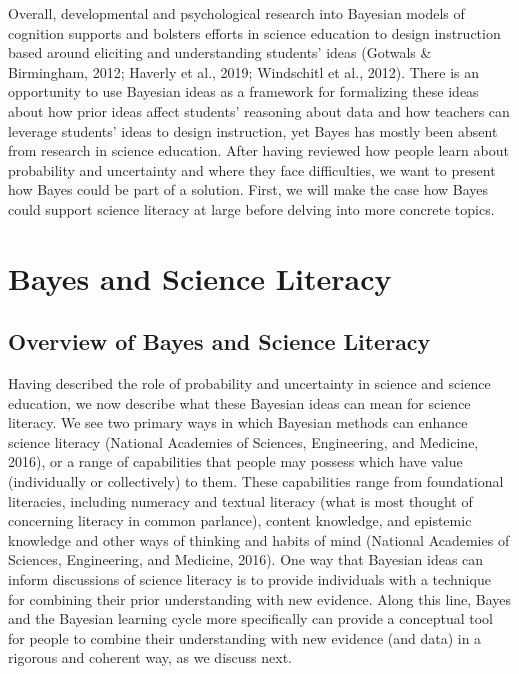 \documentclass[man]{apa7}
\begin{document}
Overall, developmental and psychological research into Bayesian models of cognition supports and bolsters efforts in science education to design instruction based around eliciting and understanding students’ ideas (Gotwals & Birmingham, 2012; Haverly et al., 2019; Windschitl et al., 2012). There is an opportunity to use Bayesian ideas as a framework for formalizing these ideas about how prior ideas affect students’ reasoning about data and how teachers can leverage students’ ideas to design instruction, yet Bayes has mostly been absent from research in science education.
After having reviewed how people learn about probability and uncertainty and where they face difficulties, we want to present how Bayes could be part of a solution. First, we will make the case how Bayes could support science literacy at large before delving into more concrete topics.

\section{Bayes and Science Literacy}

\subsection{Overview of Bayes and Science Literacy}

Having described the role of probability and uncertainty in science and science education, we now describe what these Bayesian ideas can mean for science literacy. We see two primary ways in which Bayesian methods can enhance science literacy (National Academies of Sciences, Engineering, and Medicine, 2016), or a range of capabilities that people may possess which have value (individually or collectively) to them. These capabilities range from foundational literacies, including numeracy and textual literacy (what is most thought of concerning literacy in common parlance), content knowledge, and epistemic knowledge and other ways of thinking and habits of mind (National Academies of Sciences, Engineering, and Medicine, 2016). One way that Bayesian ideas can inform discussions of science literacy is to provide individuals with a technique for combining their prior understanding with new evidence. Along this line, Bayes and the Bayesian learning cycle more specifically can provide a conceptual tool for people to combine their understanding with new evidence (and data) in a rigorous and coherent way, as we discuss next. 
\end{document}
